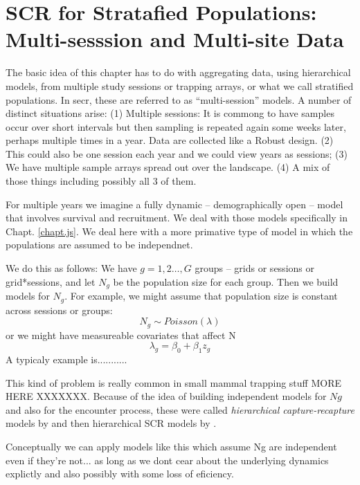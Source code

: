 \chapter{SCR for Stratafied Populations: 
Multi-sesssion and Multi-site Data}
\label{chapt.hscr}

\vspace{0.3cm}



The basic idea of this chapter has to do with aggregating data, using
hierarchical models, from multiple study sessions or trapping arrays,
or what we call stratified populations.  In secr, these are referred
to as ``multi-session'' models. 
A number of distinct situations arise:
(1) Multiple sessions:
It is commong to have samples occur over short intervals but then
sampling is repeated again some weeks later, perhaps multiple times in
a year.  Data are collected like a Robust design.
(2) This could also be one session each year and we could view years
as sessions;
(3) We have multiple sample arrays spread out over the landscape.
(4) A mix of those things including possibly all 3 of them.

For multiple years we imagine a fully dynamic -- demographically open
-- model that involves survival and recruitment. We deal with those
models specifically in Chapt. \ref{chapt.js}.
We deal here with a more primative type of model in which the
populations are assumed to be independnet. 

We do this as follows: We have $g=1,2\ldots, G$ groups -- grids or
sessions or grid*sessions, and let $N_{g}$ be the population size for
each group. Then we build models for $N_{g}$. For example, we might
assume that population size is constant across sessions or groups:
\[
 N_{g} \sim Poisson(\lambda)
\]
or we might have measureable covariates that affect N
\[
 \lambda_{g} = \beta_{0} + \beta_{1} z_{g}
\]
A typicaly example is...........

This kind of problem is really common in small mammal trapping stuff
\citep{converse_royle:xxxx} MORE HERE XXXXXXX.
Because of the idea of building independent models for $Ng$ and also
for the encounter process, these were called 
{\it hierarchical capture-recapture} models by \citep{royle_etal:2013}
and then hierarchical SCR models by \citep{converse_royle:2013}. 

Conceptually we can apply models like this which assume Ng are
independent even if they're not... as long as we dont cear about the
underlying dynamics explictly and also possibly with some loss of
eficiency. 

